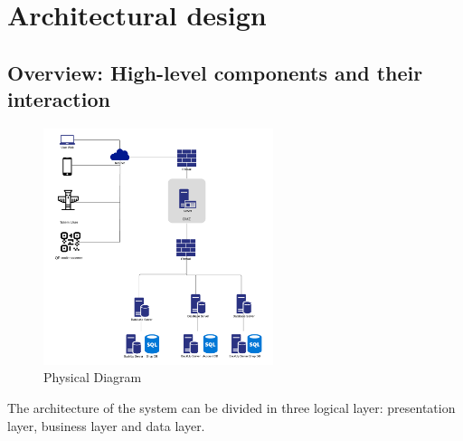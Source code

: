 \section{Architectural design}
\label{sect:overalldescription}

\subsection{Overview: High-level components and their interaction}
\label{subsect:Overview:Highlevelcomponentsandtheirinteraction}
\begin{figure}[h!]
    \centering
    \includegraphics[width=0.6\textwidth]{Images/PhysicalDiagram.png}
    \caption{\label{fig:PhysicalDiagram}{Physical Diagram}}
\end{figure}
The architecture of the system can be divided in three logical layer: presentation layer, business layer and data layer.

